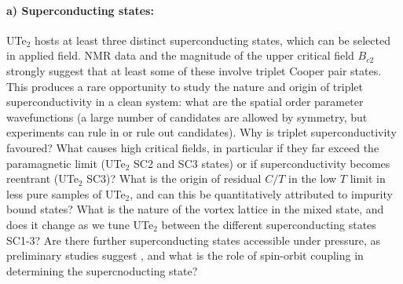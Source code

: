 


\paragraph{a) Superconducting states:} UTe$_2$ hosts at least three distinct superconducting states, which can be selected in applied field. NMR data \cite{} and the magnitude of the upper critical field $B_{c2}$ strongly suggest that at least some of these involve triplet Cooper pair states. This produces a rare opportunity to study the nature and origin of triplet superconductivity in a clean system: what are the spatial order parameter wavefunctions (a large number of candidates are allowed by symmetry, but experiments can rule in or rule out candidates). Why is triplet superconductivity favoured? What causes high critical fields, in particular if they far exceed the paramagnetic limit (UTe$_2$ SC2 and SC3 states) or if superconductivity becomes reentrant (UTe$_2$ SC3)? %
What is the origin of residual $C/T$ in the low $T$ limit in less pure samples of UTe$_2$, and can this be quantitatively attributed to impurity bound states? What is the nature of the vortex lattice in the mixed state, and does it change as we tune UTe$_2$ between the different superconducting states SC1-3? Are there further superconducting states accessible under pressure, as preliminary studies suggest \cite{}, and what is the role of spin-orbit coupling in determining the supercnoducting state?

